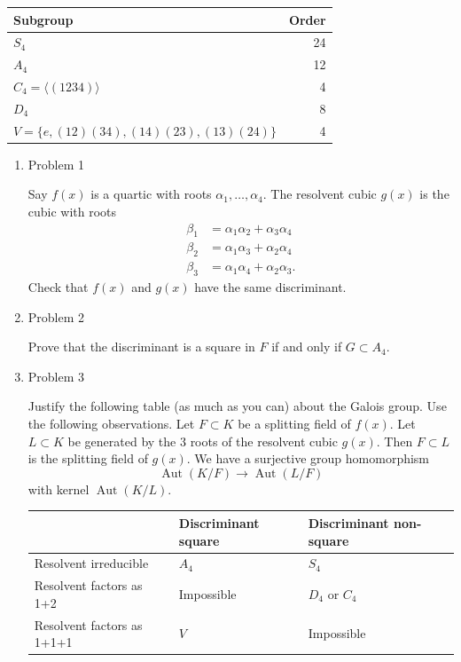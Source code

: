 \documentclass[11pt]{article}
\begin{document}
\begin{center}
\begin{tabular}{lr}
Subgroup & Order\\
\hline
\(S_4\) & 24\\
\(A_4\) & 12\\
\(C_4 = \langle (1234) \rangle\) & 4\\
\(D_4\) & 8\\
\(V = \{e,(12)(34), (14)(23), (13)(24) \}\) & 4\\
\hline
\end{tabular}
\end{center}
\begin{enumerate}
\item Problem 1
\label{sec:orgfa96e8a}

Say \(f(x)\) is a quartic with roots \(\alpha_1, \dots, \alpha_4\).
The resolvent cubic \(g(x)\) is the cubic with roots 
\begin{align*}
\beta_1 &= \alpha_1\alpha_2 + \alpha_3\alpha_4\\
\beta_2 &= \alpha_1\alpha_3 + \alpha_2\alpha_4\\
\beta_3 &= \alpha_1\alpha_4 + \alpha_2\alpha_3.
\end{align*}
Check that \(f(x)\) and \(g(x)\) have the same discriminant.
\item Problem 2
\label{sec:org41df59d}

Prove that the discriminant is a square in \(F\) if and only if \(G \subset A_4\).
\item Problem 3
\label{sec:org7b72a9e}

Justify the following table (as much as you can) about the Galois group.
Use the following observations.
Let \(F \subset K\) be a splitting field of \(f(x)\).
Let \(L \subset K\) be generated by the 3 roots of the resolvent cubic \(g(x)\).
Then \(F \subset L\) is the splitting field of \(g(x)\).
We have a surjective group homomorphism
\[ \operatorname{Aut}(K/F) \to \operatorname{Aut}(L/F)\]
with kernel \(\operatorname{Aut}(K/L)\).


\begin{center}
\begin{tabular}{lll}
 & Discriminant square & Discriminant non-square\\
\hline
Resolvent irreducible & \(A_4\) & \(S_4\)\\
Resolvent factors as 1+2 & Impossible & \(D_4\) or \(C_4\)\\
Resolvent factors as 1+1+1 & \(V\) & Impossible\\
\hline
\end{tabular}
\end{center}
\end{enumerate}
\end{document}
